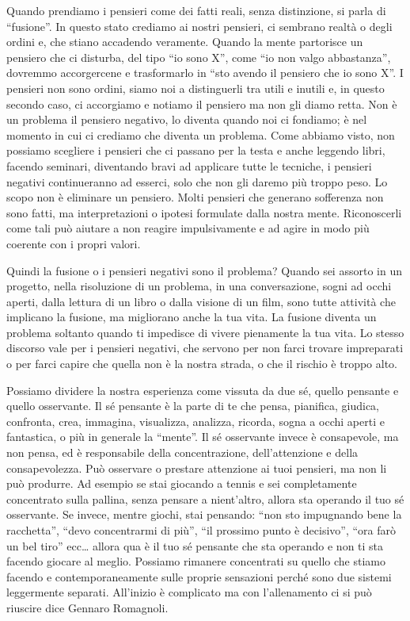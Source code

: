 \documentclass[12pt]{book} %
\begin{document}
Quando prendiamo i pensieri come dei fatti reali, senza distinzione, si parla di “fusione”. In questo stato crediamo ai
nostri pensieri, ci sembrano realtà o degli ordini e, che stiano accadendo veramente. Quando la mente
partorisce un pensiero che ci disturba, del tipo “io sono X”, come “io non valgo abbastanza”, dovremmo accorgercene e
trasformarlo in “sto avendo il pensiero che io sono X”. I pensieri non sono ordini, siamo noi a distinguerli tra
utili e inutili e, in questo secondo caso, ci accorgiamo e notiamo il pensiero ma non gli diamo retta. Non è un
problema il pensiero negativo, lo diventa quando noi ci fondiamo; è nel momento in cui ci crediamo che diventa un
problema. Come abbiamo visto, non possiamo scegliere i pensieri che ci passano per la testa e anche leggendo libri,
facendo seminari, diventando bravi ad applicare tutte le tecniche, i pensieri negativi continueranno ad esserci, solo
che non gli daremo più troppo peso. Lo scopo non è eliminare un pensiero. Molti pensieri che generano sofferenza non sono fatti, ma interpretazioni o ipotesi formulate dalla nostra mente. Riconoscerli come tali può aiutare a non reagire impulsivamente e ad agire in modo più coerente con i propri valori. 

Quindi la fusione o i pensieri negativi sono il problema? Quando sei assorto in un progetto, nella risoluzione di un
problema, in una conversazione, sogni ad occhi aperti, dalla lettura di un libro o dalla visione di un film, sono tutte
attività che implicano la fusione, ma migliorano anche la tua vita. La fusione diventa un problema soltanto quando ti
impedisce di vivere pienamente la tua vita. Lo stesso discorso vale per i pensieri negativi, che servono per non farci
trovare impreparati o per farci capire che quella non è la nostra strada, o che il rischio è troppo alto. 

Possiamo dividere la nostra esperienza come vissuta da due sé, quello pensante e quello osservante. Il sé pensante è la
parte di te che pensa, pianifica, giudica, confronta, crea, immagina, visualizza, analizza, ricorda, sogna a occhi
aperti e fantastica, o più in generale la “mente”. Il sé osservante invece è consapevole, ma non pensa, ed è
responsabile della concentrazione, dell'attenzione e della consapevolezza. Può osservare o
prestare attenzione ai tuoi pensieri, ma non li può produrre. Ad esempio se stai giocando a tennis e sei completamente
concentrato sulla pallina, senza pensare a nient'altro, allora sta operando il tuo sé osservante.
Se invece, mentre giochi, stai pensando: “non sto impugnando bene la racchetta”, “devo concentrarmi di più”, “il
prossimo punto è decisivo”, “ora farò un bel tiro” ecc… allora qua è il tuo sé pensante che sta operando e non ti sta
facendo giocare al meglio. Possiamo rimanere concentrati su quello che stiamo facendo e contemporaneamente sulle proprie sensazioni perché sono due sistemi leggermente separati. All'inizio è complicato ma con l'allenamento ci si può riuscire dice Gennaro Romagnoli.
\end{document}
